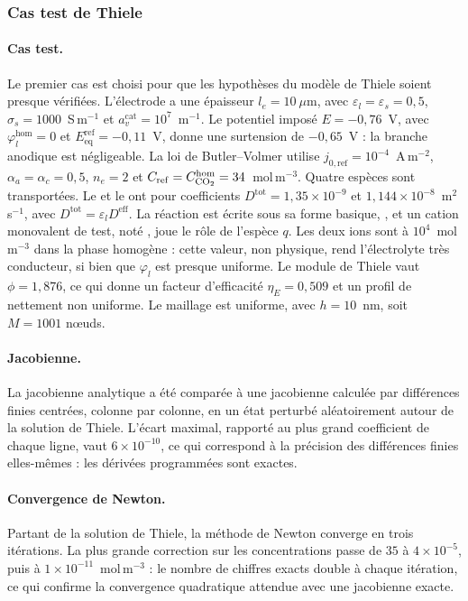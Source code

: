 \subsubsection*{Cas test de Thiele}

\paragraph{Cas test.} Le premier cas est choisi pour que les
hypothèses du modèle de Thiele soient presque vérifiées. L'électrode a une
épaisseur $l_e = 10~\mu$m, avec $\varepsilon_l = \varepsilon_s = 0{,}5$,
$\sigma_s = 1000$~S\,m$^{-1}$ et
$a_v^{\mathrm{cat}} = 10^7$~m$^{-1}$. Le potentiel imposé
$E = -0{,}76$~V, avec $\varphi_l^{\mathrm{hom}} = 0$ et
$E_{\mathrm{eq}}^{\mathrm{ref}} = -0{,}11$~V, donne une surtension de
$-0{,}65$~V : la branche anodique est négligeable. La loi de Butler--Volmer
utilise $j_{0,\mathrm{ref}} = 10^{-4}$~A\,m$^{-2}$,
$\alpha_a = \alpha_c = 0{,}5$, $n_e = 2$ et
$C_{\mathrm{ref}} = C_{\ce{CO2}}^{\mathrm{hom}} = 34$~mol\,m$^{-3}$. Quatre
espèces sont transportées. Le  et le  ont pour coefficients
$D^{\mathrm{tot}} = 1{,}35\times10^{-9}$ et
$1{,}144\times10^{-8}$~m$^2$\,s$^{-1}$, avec
$D^{\mathrm{tot}} = \varepsilon_l D^{\mathrm{eff}}$. La réaction est écrite
sous sa forme basique,
, et un cation monovalent de test, noté
, joue le rôle de l'espèce $q$. Les deux ions sont à
$10^4$~mol\,m$^{-3}$ dans la phase homogène : cette valeur, non physique,
rend l'électrolyte très conducteur, si bien que $\varphi_l$ est presque
uniforme. Le module de Thiele vaut $\phi = 1{,}876$, ce qui donne un facteur
d'efficacité $\eta_E = 0{,}509$ et un profil de  nettement non
uniforme. Le maillage est uniforme, avec $h = 10$~nm, soit $M = 1001$ nœuds.

\paragraph{Jacobienne.} La jacobienne analytique a été comparée à une
jacobienne calculée par différences finies centrées, colonne par colonne, en
un état perturbé aléatoirement autour de la solution de Thiele. L'écart
maximal, rapporté au plus grand coefficient de chaque ligne, vaut
$6\times10^{-10}$, ce qui correspond à la précision des différences finies
elles-mêmes : les dérivées programmées sont exactes.

\paragraph{Convergence de Newton.} Partant de la solution de Thiele, la
méthode de Newton converge en trois itérations. La plus grande correction sur
les concentrations passe de $35$ à $4\times10^{-5}$, puis à
$1\times10^{-11}$~mol\,m$^{-3}$ : le nombre de chiffres exacts double à
chaque itération, ce qui confirme la convergence quadratique attendue avec une
jacobienne exacte.

